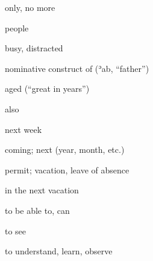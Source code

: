 \documentclass[avery5371,grid,frame]{flashcards}
\begin{document}
\begin{flashcard}{\LARGE only, no more}
\LARGE {}
\end{flashcard}
\begin{flashcard}{\LARGE people}
\LARGE {}
\end{flashcard}
\begin{flashcard}{\LARGE busy, distracted}
\LARGE {}
\end{flashcard}
\begin{flashcard}{\LARGE nominative construct of  (ʾab, “father”)}
\LARGE {}
\end{flashcard}
\begin{flashcard}{\LARGE aged (``great in years'')}
\LARGE {}
\end{flashcard}
\begin{flashcard}{\LARGE also}
\LARGE {}
\end{flashcard}
\begin{flashcard}{\LARGE next week}
\LARGE {}
\end{flashcard}
\begin{flashcard}{\LARGE coming; next (year, month, etc.)}
\LARGE {}
\end{flashcard}
\begin{flashcard}{\LARGE permit; vacation, leave of absence}
\LARGE {}
\end{flashcard}
\begin{flashcard}{\LARGE in the next vacation}
\LARGE {}
\end{flashcard}
\begin{flashcard}{\LARGE to be able to, can}
\LARGE {}
\end{flashcard}
\begin{flashcard}{\LARGE to see}
\LARGE {}
\end{flashcard}
\begin{flashcard}{\LARGE to understand, learn, observe}
\LARGE {}
\end{flashcard}
\end{document}
